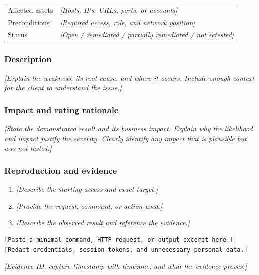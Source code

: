 \documentclass[11pt,letterpaper]{article}
\newcommand{\prompt}[1]{\textit{\textcolor{muted}{[#1]}}}
\begin{document}
\begin{tabularx}{\textwidth}{@{}lY@{}}
  \toprule
  Affected assets & \prompt{Hosts, IPs, URLs, ports, or accounts} \\
  Preconditions & \prompt{Required access, role, and network position} \\
  Status & \prompt{Open / remediated / partially remediated / not retested} \\
  \bottomrule
\end{tabularx}

\subsubsection*{Description}
\prompt{Explain the weakness, its root cause, and where it occurs. Include
enough context for the client to understand the issue.}

\subsubsection*{Impact and rating rationale}
\prompt{State the demonstrated result and its business impact. Explain why
the likelihood and impact justify the severity. Clearly identify any impact
that is plausible but was not tested.}

\subsubsection*{Reproduction and evidence}
\begin{enumerate}
  \item \prompt{Describe the starting access and exact target.}
  \item \prompt{Provide the request, command, or action used.}
  \item \prompt{Describe the observed result and reference the evidence.}
\end{enumerate}

\begin{lstlisting}
[Paste a minimal command, HTTP request, or output excerpt here.]
[Redact credentials, session tokens, and unnecessary personal data.]
\end{lstlisting}

\prompt{Evidence ID, capture timestamp with timezone, and what the evidence proves.}

\end{document}

